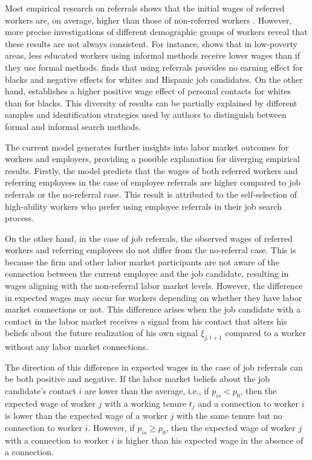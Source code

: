 \documentclass[12pt]{article}
\begin{document}
Most empirical research on referrals shows that the initial wages of referred workers are, on average, higher than those of non-referred workers \citep{corcoran1980most, simon1992matchmaker, loury2006some, dustmann2016referral}. However, more precise investigations of different demographic groups of workers reveal that these results are not always consistent. For instance, \cite{elliott1999social} shows that in low-poverty areas, less educated workers using informal methods receive lower wages than if they use formal methods. \cite{green1999racial} finds that using referrals provides no earning effect for blacks and negative effects for whites and Hispanic job candidates. On the other hand, \cite{korenman1996employment} establishes a higher positive wage effect of personal contacts for whites than for blacks. This diversity of results can be partially explained by different samples and identification strategies used by authors to distinguish between formal and informal search methods.

The current model generates further insights into labor market outcomes for workers and employers, providing a possible explanation for diverging empirical results. Firstly, the model predicts that the wages of both referred workers and referring employees in the case of employee referrals are higher compared to job referrals or the no-referral case. This result is attributed to the self-selection of high-ability workers who prefer using employee referrals in their job search process.

On the other hand, in the case of job referrals, the observed wages of referred workers and referring employees do not differ from the no-referral case. This is because the firm and other labor market participants are not aware of the connection between the current employee and the job candidate, resulting in wages aligning with the non-referral labor market levels. However, the difference in expected wages may occur for workers depending on whether they have labor market connections or not. This difference arises when the job candidate with a contact in the labor market receives a signal from his contact that alters his beliefs about the future realization of his own signal $\xi_{j,t+1}$ compared to a worker without any labor market connections.

The direction of this difference in expected wages in the case of job referrals can be both positive and negative. If the labor market beliefs about the job candidate's contact $i$ are lower than the average, i.e., if $p_{is} < p_{0}$, then the expected wage of worker $j$ with a working tenure $t_j$ and a connection to worker $i$ is lower than the expected wage of a worker $j$ with the same tenure but no connection to worker $i$. However, if $p_{is} \geq p_{0}$, then the expected wage of worker $j$ with a connection to worker $i$ is higher than his expected wage in the absence of a connection.
\end{document}
